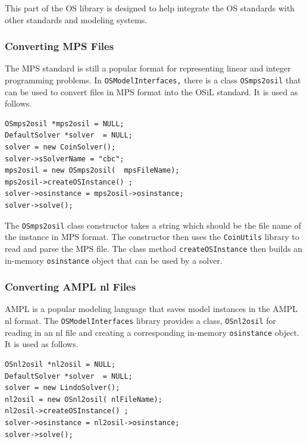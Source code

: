 \documentclass[11pt]{article}
\renewcommand{\_}{{\char"5F}}
\renewcommand{\{}{{\char"7B}}
\renewcommand{\}}{{\char"7D}}
\renewcommand{\^}{{\char"0D}}
\renewcommand{\'}{{\char"0D}}
\begin{document}
\begin{enumerate}[Step 1:]
This part of the OS library is designed to help integrate the OS standards with other standards and modeling systems.

\subsubsection{Converting MPS Files}

The MPS standard is still a popular format for representing linear and integer programming problems.
In {\tt OSModelInterfaces,} there is a class {\tt OSmps2osil} that can be used
to convert files in MPS format into the OSiL standard. It is used as follows.

\begin{verbatim}
OSmps2osil *mps2osil = NULL;
DefaultSolver *solver  = NULL;
solver = new CoinSolver();
solver->sSolverName = "cbc";
mps2osil = new OSmps2osil(  mpsFileName);
mps2osil->createOSInstance() ;
solver->osinstance = mps2osil->osinstance;
solver->solve();
\end{verbatim}

The {\tt OSmps2osil} class constructor takes a string which should be the
file name of the instance in MPS format. The constructor then uses the
{\tt CoinUtils} library to read and parse the MPS file.  The class method {\tt createOSInstance} then builds  an in-memory {\tt osinstance} object  that can be used by a solver.

\subsubsection{Converting AMPL nl Files}\label{section:nl2osil}

AMPL is a popular modeling language that saves  model instances in the AMPL nl format.
The {\tt OSModelInterfaces} library provides a class, {\tt OSnl2osil} for reading
in an nl file and creating a
corresponding in-memory  {\tt osinstance} object. It is used as follows.

\begin{verbatim}
OSnl2osil *nl2osil = NULL;
DefaultSolver *solver  = NULL;
solver = new LindoSolver();
nl2osil = new OSnl2osil( nlFileName);
nl2osil->createOSInstance() ;
solver->osinstance = nl2osil->osinstance;
solver->solve();
\end{verbatim}



\end{enumerate}
\end{document}

